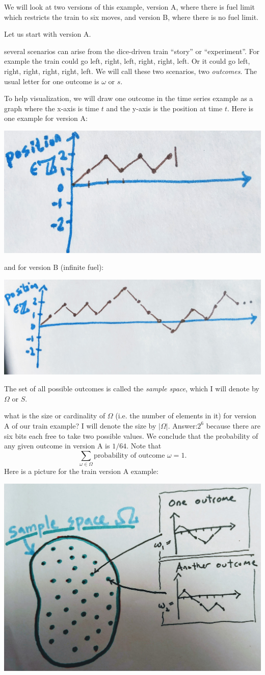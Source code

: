 \documentclass{article}
\begin{document}
We will look at two versions of this example, version A, where there is fuel limit which restricts the train to six moves, and version B, where there is no fuel limit. 

Let us start with version A. 

 several scenarios can arise from the dice-driven train ``story'' or ``experiment''. For example the train could go left, right, left, right, right, left. Or it could go left, right, right, right, right, left. We will call these two scenarios, two \emph{outcomes}. The usual letter for one outcome is $\omega$ or $s$. 

To help visualization, we will draw one outcome in the time series example as a graph where the x-axis is time $t$ and the y-axis is the position at time $t$. Here is one example for version A:
\begin{center}
\includegraphics[width=0.5\linewidth]{figures/train1}
\end{center}
and for version B (infinite fuel):
\begin{center}
	\includegraphics[width=0.5\linewidth]{figures/train2}
\end{center}

 The set of all possible outcomes is called the \emph{sample space}, which I will denote by $\Omega$ or $S$. 

 what is the size or cardinality of $\Omega$ (i.e. the number of elements in it) for version A of our train example? I will denote the size by $|\Omega|$. Answer:$2^6$ because there are six bits each free to take two possible values. We conclude that the probability of any given outcome in version A is $1/64$. Note that 
\[ \sum_{\omega \in \Omega} \text{probability of outcome $\omega$} = 1. \]
Here is a picture for the train version A example:
\begin{center}
	\includegraphics[width=0.5\linewidth]{figures/outcomes}
\end{center}
\end{document}
